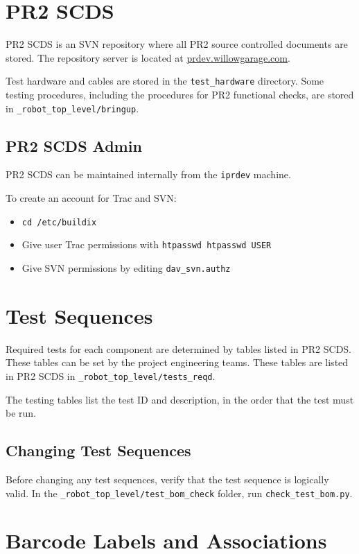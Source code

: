 \documentclass[11pt]{report}
\begin{document}
\section{PR2 SCDS}

PR2 SCDS is an SVN repository where all PR2 source controlled documents are stored. The repository server is located at \href{http://prdev.willowgarage.com}{prdev.willowgarage.com}.

Test hardware and cables are stored in the \texttt{test\_hardware} directory. Some testing procedures, including the procedures for PR2 functional checks, are stored in \texttt{\_robot\_top\_level/bringup}.

\subsection{PR2 SCDS Admin}

PR2 SCDS can be maintained internally from the \texttt{iprdev} machine. 

To create an account for Trac and SVN:
\begin{itemize}
\item \texttt{cd /etc/buildix}
\item Give user Trac permissions with \texttt{htpasswd htpasswd USER}
\item Give SVN permissions by editing \texttt{dav\_svn.authz}
\end{itemize}

\section{Test Sequences}

Required tests for each component are determined by tables listed in PR2 SCDS. These tables can be set by the project engineering teams. These tables are listed in PR2 SCDS in \texttt{\_robot\_top\_level/tests\_reqd}. 

The testing tables list the test ID and description, in the order that the test must be run.

\subsection{Changing Test Sequences}

Before changing any test sequences, verify that the test sequence is logically valid. In the \texttt{\_robot\_top\_level/test\_bom\_check} folder, run \texttt{check\_test\_bom.py}. 

\section{Barcode Labels and Associations}
\end{document}
